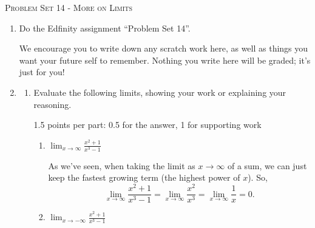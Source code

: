\documentclass{article}
\newcommand{\doedfinity}[2][\newpage]{
  \begin{problem}[#1]
    Do the Edfinity assignment ``Problem Set #2''.

    We encourage you to write down any scratch work here, as well as
    things you want your future self to remember. Nothing you write
    here will be graded; it's just for you!
  \end{problem}
}
\begin{document}
\begin{center}
  \large\textsc{Problem Set 14 - More on Limits}
\end{center}

\begin{enumerate}
\item  {}

  \doedfinity{14}

\item \label{limits-choose-graph-1}

  \begin{enumerate}
  \item \label{limits-choose-graph-1-evaluate}

    Evaluate the following limits, showing your work or explaining your reasoning.

    \begin{grading}
      1.5 points per part: 0.5 for the answer, 1 for supporting work
    \end{grading}

    \begin{enumerate} 
    \item
      \begin{problem}[\vfill]
        $\displaystyle \lim_{x \to \infty} \frac{x^2 + 1}{x^3 - 1}$
      \end{problem}

      \begin{solution}
        As we've seen, when taking the limit as $x \to \infty$ of a sum, we can just keep the fastest growing term (the highest power of $x$). So,
        \[
          \lim_{x \to \infty} \frac{x^2 + 1}{x^3 - 1} = \lim_{x \to \infty} \frac{x^2}{x^3}
          = \lim_{x \to \infty} \frac{1}{x} = 0.
        \]
      \end{solution}

    \item
      \begin{problem}[\vfill]
        $\displaystyle \lim_{x \to -\infty} \frac{x^2 + 1}{x^3 - 1}$
      \end{problem}


\end{enumerate}
\end{enumerate}
\end{enumerate}
\end{document}

